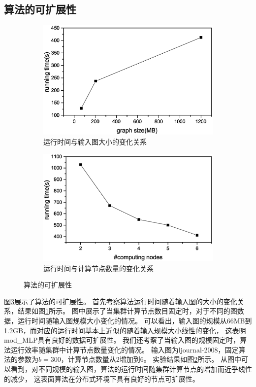 \documentclass[master]{njuthesis}
\begin{document}
\subsection{算法的可扩展性}
\begin{figure}[t]
\centering
\begin{subfigure}[b]{0.48\textwidth}
	\center
	\includegraphics[width=1\textwidth]{figure/data_scala.eps}
	\caption{运行时间与输入图大小的变化关系}
	\label{fig:ch2:data_scalabity}
\end{subfigure}
\begin{subfigure}[b]{0.48\textwidth}
	\centering
	\includegraphics[width=1\textwidth]{figure/node_scalabity.eps}
	\caption{运行时间与计算节点数量的变化关系}
	\label{fig:ch2:node_scalabity}
\end{subfigure}
\label{fig:scalabity}
\caption{算法的可扩展性}
\end{figure}
图\ref{fig:scalabity}展示了算法的可扩展性。
首先考察算法运行时间随着输入图的大小的变化关系，结果如图\ref{fig:ch2:data_scalabity}所示。
图中展示了当集群计算节点数目固定时，对于不同的图数据，运行时间随输入图规模大小变化的情况。 
可以看出，输入图的规模从66MB到1.2GB，而对应的运行时间基本上近似的随着输入规模大小线性的变化，
这表明mod\string_MLP具有良好的数据可扩展性。
我们还考察了当输入图的规模固定时，算法运行效率随集群中计算节点数量变化的情况。
输入图为ljournal-2008，固定算法的参数为$b=300$，计算节点数量从2增加到6。
实验结果如图\ref{fig:ch2:node_scalabity}所示。
从图中可以看到，对不同规模的输入图，算法的运行时间随集群计算节点的增加而近乎线性的减少，
这表面算法在分布式环境下具有良好的节点可扩展性。
\end{document}
